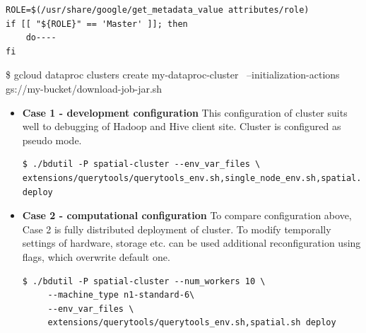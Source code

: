 \documentclass[a4paper,12pt,oneside]{report}
\begin{document}
 \begin{footnotesize}
\begin{lstlisting}[style=python]
ROLE=$(/usr/share/google/get_metadata_value attributes/role)
if [[ "${ROLE}" == 'Master' ]]; then 
	do----
fi
\end{lstlisting}
\end{footnotesize}
 
\$ gcloud dataproc clusters create my-dataproc-cluster \
    --initialization-actions gs://my-bucket/download-job-jar.sh
 
 
 
\begin{itemize}
\item \textbf{Case 1 - development configuration}  This configuration of cluster suits well to debugging 
of Hadoop and Hive client site. Cluster is configured as pseudo mode.
\begin{footnotesize}
\begin{lstlisting}[style=python]
$ ./bdutil -P spatial-cluster --env_var_files \
extensions/querytools/querytools_env.sh,single_node_env.sh,spatial.sh deploy
\end{lstlisting}
\end{footnotesize}


\item \textbf{Case 2 - computational configuration}  To compare configuration above, Case 2 is fully 
distributed deployment of cluster. To modify temporally settings of hardware, storage etc. can be used 
additional reconfiguration using flags, which overwrite default one.
%
\begin{footnotesize}
\begin{lstlisting}[style=python]
$ ./bdutil -P spatial-cluster --num_workers 10 \
     --machine_type n1-standard-6\
     --env_var_files \
     extensions/querytools/querytools_env.sh,spatial.sh deploy
\end{lstlisting}
\end{footnotesize}
\end{itemize}
\end{document}
